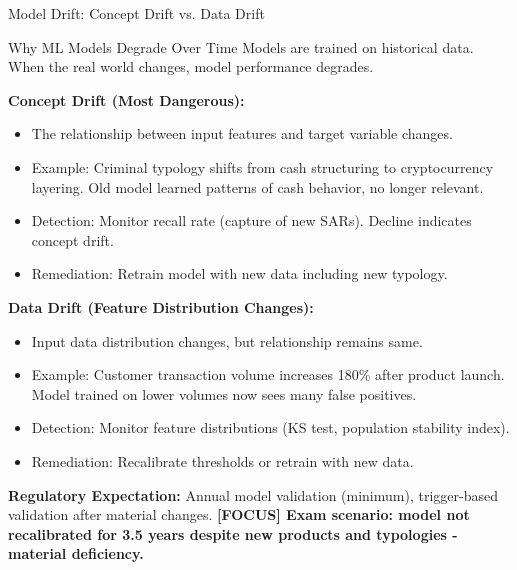 \documentclass[11pt,a4paper]{beamer}
\newcommand{\examfocus}[1]{\textcolor{orange!80!black}{\textbf{[FOCUS] #1}}}
\begin{document}
\begin{frame}{Model Drift: Concept Drift vs. Data Drift}
	\begin{block}{Why ML Models Degrade Over Time}
		Models are trained on historical data. When the real world changes, model performance degrades.
	\end{block}
	\textbf{Concept Drift (Most Dangerous):}
	\begin{itemize}
		\item The relationship between input features and target variable changes.
		\item Example: Criminal typology shifts from cash structuring to cryptocurrency layering. Old model learned patterns of cash behavior, no longer relevant.
		\item Detection: Monitor recall rate (capture of new SARs). Decline indicates concept drift.
		\item Remediation: Retrain model with new data including new typology.
	\end{itemize}
	\textbf{Data Drift (Feature Distribution Changes):}
	\begin{itemize}
		\item Input data distribution changes, but relationship remains same.
		\item Example: Customer transaction volume increases 180\% after product launch. Model trained on lower volumes now sees many false positives.
		\item Detection: Monitor feature distributions (KS test, population stability index).
		\item Remediation: Recalibrate thresholds or retrain with new data.
	\end{itemize}
	\textbf{Regulatory Expectation:} Annual model validation (minimum), trigger-based validation after material changes.
	\examfocus{Exam scenario: model not recalibrated for 3.5 years despite new products and typologies - material deficiency.}
\end{frame}
\end{document}
